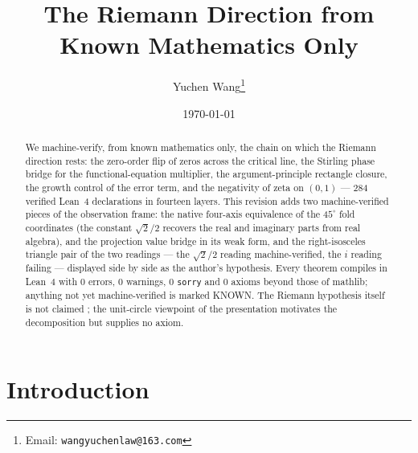 \documentclass{article}
\title{The Riemann Direction from Known Mathematics Only}
\author{Yuchen Wang\thanks{Email: \texttt{wangyuchenlaw@163.com}}}
\date{\today}
\begin{document}
\maketitle

\begin{abstract}
We machine-verify, from known mathematics only, the chain on which the
Riemann direction rests: the zero-order flip of zeros across the critical
line, the Stirling phase bridge for the functional-equation multiplier, the
argument-principle rectangle closure, the growth control of the error term,
and the negativity of zeta on $(0,1)$ --- 284 verified Lean~4 declarations
in fourteen layers. This revision adds two machine-verified pieces of the
observation frame: the native four-axis equivalence of the $45^\circ$ fold
coordinates (the constant $\sqrt2/2$ recovers the real and imaginary parts
from real algebra), and the projection value bridge in its weak form, and
the right-isosceles triangle pair of the two readings --- the $\sqrt2/2$
reading machine-verified, the $i$ reading failing --- displayed side by
side as the author's hypothesis. Every theorem compiles in Lean~4 with 0
errors, 0 warnings, 0 \texttt{sorry} and 0 axioms beyond those of mathlib;
anything not yet machine-verified is marked KNOWN. The Riemann hypothesis
itself is not claimed \cite{riemann1859, edwards1974, ivic1985,
titchmarsh}; the unit-circle viewpoint of the presentation
motivates the decomposition but supplies no axiom.
\end{abstract}

\section{Introduction}
\label{sec:intro}
\end{document}

